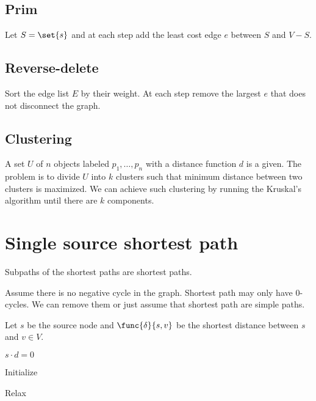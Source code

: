 \subsection*{Prim}
Let \(S = \set{s}\) and at each step add the least cost edge \(e\) between \(S\) and \(V - S\).
\subsection*{Reverse-delete}
Sort the edge list \(E\) by their weight. At each step remove the largest \(e\) that does not disconnect the graph.
\subsection*{Clustering}
A set \(U\) of \(n\) objects labeled \(p_1, \dots, p_n\) with a distance function \(d\) is a given. The problem is to divide \(U\) into \(k\) clusters such that minimum distance between two clusters is maximized. We can achieve such clustering by running the Kruskal's algorithm until there are \(k\) components.
\section*{Single source shortest path}
\begin{lemma}
    Subpaths of the shortest paths are shortest paths.
\end{lemma}
Assume there is no negative cycle in the graph. Shortest path may only have \(0\)-cycles. We can remove them or just assume that shortest path are simple paths.

Let \(s\) be the source node and \(\func{\delta}{s,v}\) be the shortest distance between \(s\) and \(v \in V\). 

\begin{algorithm}
    \DontPrintSemicolon
    \(s \cdot d = 0\)
    \caption{Initialize}
\end{algorithm}


\begin{algorithm}
    \DontPrintSemicolon
    \caption{Relax}
\end{algorithm}


